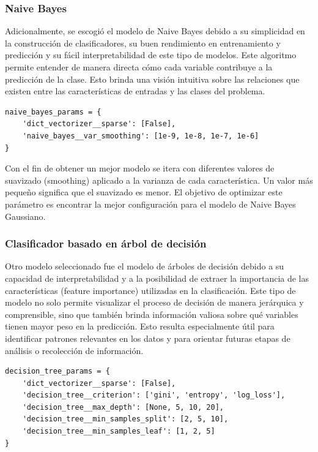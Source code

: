 \documentclass[11pt,a4paper,spanish]{book}
\numberwithin{equation}{chapter}
\numberwithin{figure}{chapter}
\begin{document}
\subsubsection{Naive Bayes}

Adicionalmente, se escogió el modelo de Naive Bayes debido a su simplicidad en la 
construcción de clasificadores, su buen rendimiento en entrenamiento y predicción y su 
fácil interpretabilidad de este tipo de modelos. Este algoritmo permite entender de 
manera directa cómo cada variable contribuye a la predicción de la clase. Esto brinda 
una visión intuitiva sobre las relaciones que existen entre las características de 
entradas y las clases del problema.


\vspace{5mm}
\begin{lstlisting}
naive_bayes_params = {
    'dict_vectorizer__sparse': [False],
    'naive_bayes__var_smoothing': [1e-9, 1e-8, 1e-7, 1e-6]
}
\end{lstlisting}


Con el fin de obtener un mejor modelo se itera con diferentes valores de suavizado 
(smoothing) aplicado a la varianza de cada característica. Un valor más pequeño 
significa que el suavizado es menor.  El objetivo de optimizar este parámetro es 
encontrar la mejor configuración para el modelo de Naive Bayes Gaussiano.


\subsubsection{Clasificador basado en árbol de decisión}

Otro modelo seleccionado fue el modelo de árboles de decisión debido a su capacidad de 
interpretabilidad y a la posibilidad de extraer la importancia de las características 
(feature importance) utilizadas en la clasificación. Este tipo de modelo no solo permite 
visualizar el proceso de decisión de manera jerárquica y comprensible, sino que también 
brinda información valiosa sobre qué variables tienen mayor peso en la predicción. 
Esto resulta especialmente útil para identificar patrones relevantes en los datos y 
para orientar futuras etapas de análisis o recolección de información.


\vspace{5mm}
\begin{lstlisting}
decision_tree_params = {
    'dict_vectorizer__sparse': [False],
    'decision_tree__criterion': ['gini', 'entropy', 'log_loss'],
    'decision_tree__max_depth': [None, 5, 10, 20],
    'decision_tree__min_samples_split': [2, 5, 10],
    'decision_tree__min_samples_leaf': [1, 2, 5]
}
\end{lstlisting}
\end{document}
